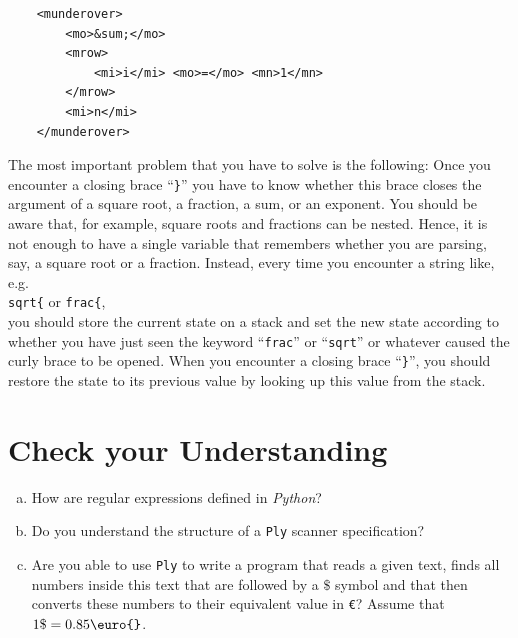 \begin{enumerate}
    \begin{verbatim}
    <munderover>
        <mo>&sum;</mo>
        <mrow>
            <mi>i</mi> <mo>=</mo> <mn>1</mn>
        </mrow>
        <mi>n</mi>
    </munderover>
    \end{verbatim}
\end{enumerate}

\remarkEng
The most important problem that you have to solve is the following:  Once you encounter a closing brace
``\texttt{\}}'' you have to know whether this brace closes the argument of a square root, a
fraction, a sum, or an exponent.  You should be aware that, for example, square roots and fractions
can be nested.  Hence, it is not enough to have a single variable that remembers whether you are
parsing, say, a square root or a fraction.  Instead, every time you encounter a string like, e.g.
\\[0.2cm]
\hspace*{1.3cm}
\texttt{sqrt\{} \quad or \quad \texttt{frac\{},
\\[0.2cm]
you should store the current state on a stack and set the new state according to whether you have just seen the
keyword ``\texttt{frac}'' or ``\texttt{sqrt}'' or whatever caused the
curly brace to be opened.  When you encounter a closing brace ``\texttt{\}}'', you should 
restore the state to its previous value by looking up this value from the stack.  
\eox

\section{Check your Understanding}
\begin{enumerate}[(a)]
\item How are regular expressions defined in \textsl{Python}?
\item Do you understand the structure of a \texttt{Ply} scanner specification?
\item Are you able to use \texttt{Ply} to write a program that reads a given text, finds all numbers inside
      this text that are followed by a $\texttt{\$}$ symbol and that then converts these numbers to their equivalent
      value in \texttt{\euro{}}?  Assume that $1 \mathtt{\$} = 0.85 \texttt{\euro{}}$.
\end{enumerate}



